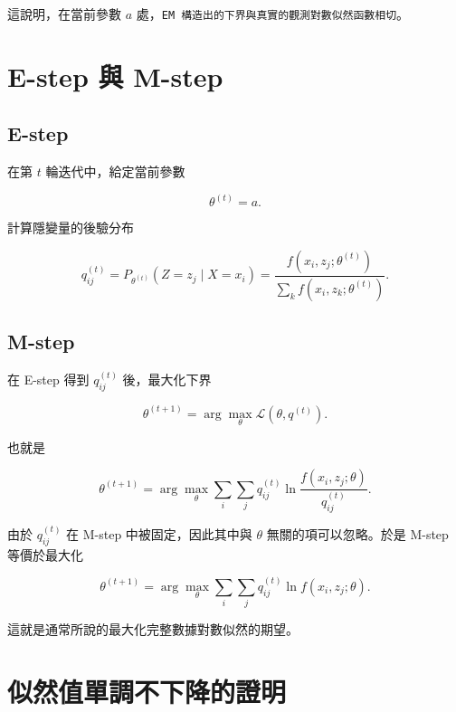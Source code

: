 這說明，在當前參數 \(a\) 處，\verb|EM 構造出的下界與真實的觀測對數似然函數相切|。

\section{E-step 與 M-step}

\subsection{E-step}

在第 \(t\) 輪迭代中，給定當前參數

\begin{equation}\label{eq-e-step-theta}
\theta^{(t)} = a.
\end{equation}

計算隱變量的後驗分布

\begin{equation}\label{eq-e-step}
q_{ij}^{(t)}
=
P_{\theta^{(t)}}(Z=z_j \mid X=x_i)
=
\frac{
f(x_i,z_j;\theta^{(t)})
}{
\sum_k f(x_i,z_k;\theta^{(t)})
}.
\end{equation}

\subsection{M-step}

在 E-step 得到 \(q_{ij}^{(t)}\) 後，最大化下界

\begin{equation}\label{eq-m-step}
\theta^{(t+1)}
=
\arg\max_{\theta}
\mathcal{L}(\theta,q^{(t)}).
\end{equation}

也就是

\begin{equation}\label{eq-m-step-expanded}
\theta^{(t+1)}
=
\arg\max_{\theta}
\sum_i
\sum_j
q_{ij}^{(t)}
\ln
\frac{
f(x_i,z_j;\theta)
}{
q_{ij}^{(t)}
}.
\end{equation}

由於 \(q_{ij}^{(t)}\) 在 M-step 中被固定，因此其中與 \(\theta\) 無關的項可以忽略。於是 M-step 等價於最大化

\begin{equation}\label{eq-m-step-simplified}
\theta^{(t+1)}
=
\arg\max_{\theta}
\sum_i
\sum_j
q_{ij}^{(t)}
\ln
f(x_i,z_j;\theta).
\end{equation}

這就是通常所說的最大化完整數據對數似然的期望。

\section{似然值單調不下降的證明}

